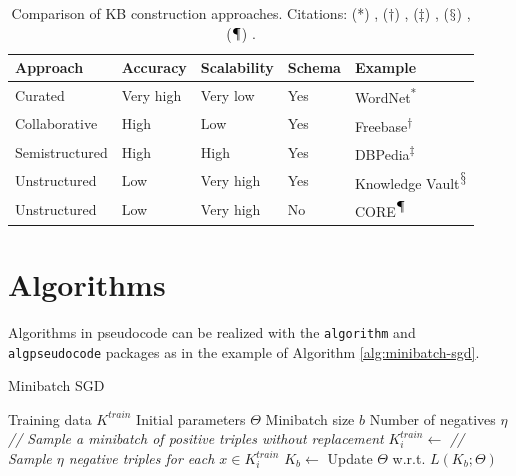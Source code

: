 \begin{table}
	\centering
	\begin{tabular}{lllll} \toprule
		Approach & Accuracy & Scalability & Schema & Example \\
		\midrule
		Curated & Very high & Very low & Yes & WordNet\textsuperscript{*} \\
		Collaborative & High & Low & Yes & Freebase\textsuperscript{$\dagger$} \\
		Semistructured & High & High & Yes & DBPedia\textsuperscript{$\ddagger$} \\
		Unstructured & Low & Very high & Yes & Knowledge Vault\textsuperscript{$\mathsection$} \\
		Unstructured & Low & Very high & No & CORE\textsuperscript{$\mathparagraph$} \\
		\bottomrule
	\end{tabular}
	\caption[Comparison of \acs{KB} construction approaches.]{Comparison of \acs{KB} construction approaches. Citations: (*) \textcite{miller_wordnet:_1995}, ($\dagger$) \textcite{bollacker_freebase:_2008}, ($\ddagger$) \textcite{auer_dbpedia:_2007}, ($\mathsection$) \textcite{dong_knowledge_2014}, ($\mathparagraph$) \textcite{petroni_core:_2015}.}
	\label{tab:kb-construction}
\end{table}
\FloatBarrier

\section{Algorithms}
\label{sec:algorithms}
Algorithms in pseudocode can be realized with the \texttt{algorithm} and \texttt{algpseudocode} packages as in the example of Algorithm \ref{alg:minibatch-sgd}.

\begin{algorithm}
	\caption{Minibatch \acl{SGD}}
	\label{alg:minibatch-sgd}
	\begin{algorithmic}[1]
		\Require Training data $K^{train}$
		\Require Initial parameters $\Theta$
		\Require Minibatch size $b$
		\Require Number of negatives $\eta$
				\State \textsl{// Sample a minibatch of positive triples without replacement}
				\State $K^{train}_i \gets$ 
				\State \textsl{// Sample $\eta$ negative triples for each $x \in K^{train}_i$}
				\State $K_b \gets$ 
				\State Update $\Theta$ w.r.t. $L(K_b; \Theta)$
			\EndFor
		\EndWhile
	\end{algorithmic}

\end{algorithm}


